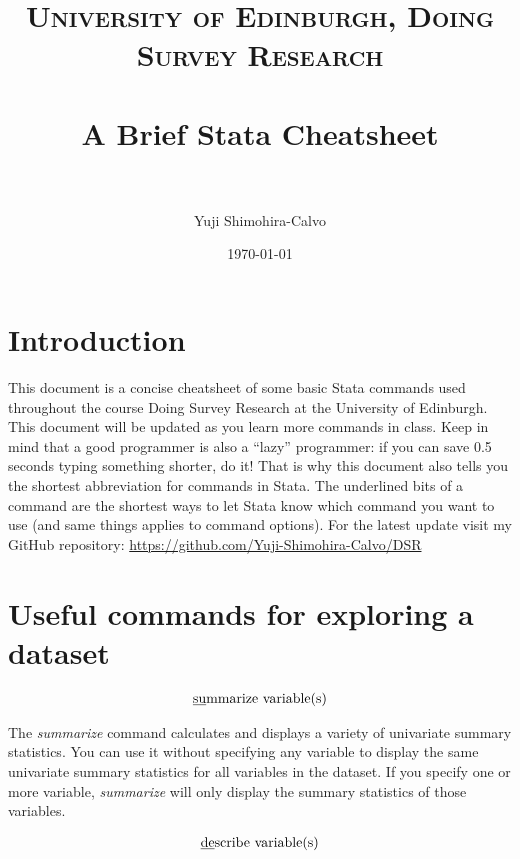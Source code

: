 \documentclass[paper=a4, fontsize=11pt]{scrartcl} %
\title{	
\normalfont \normalsize 
\textsc{University of Edinburgh, Doing Survey Research} \\ [25pt] %
\horrule{0.5pt} \\[0.4cm] %
\huge A Brief Stata Cheatsheet \\ %
\horrule{2pt} \\[0.5cm] %
}
\author{Yuji Shimohira-Calvo} %
\date{\normalsize\today} %
\numberwithin{equation}{section} %
\numberwithin{figure}{section} %
\numberwithin{table}{section} %
\begin{document}
\maketitle %


\section*{Introduction}

This document is a concise cheatsheet of some basic Stata commands used throughout the course Doing Survey Research at the University of Edinburgh. This document will be updated as you learn more commands in class. Keep in mind that a good programmer is also a ``lazy'' programmer: if you can save 0.5 seconds typing something shorter, do it! That is why this document also tells you the shortest abbreviation for commands in Stata. The underlined bits of a command are the shortest ways to let Stata know which command you want to use (and same things applies to command options). For the latest update visit my GitHub repository: \url{https://github.com/Yuji-Shimohira-Calvo/DSR}  


\section{Useful commands for exploring a dataset}

\begin{align} 
\text{\underline{su}mmarize variable(s)}
\end{align}

The \textit{summarize} command calculates and displays a variety of univariate summary statistics. You can use it without specifying any variable to display the same univariate summary statistics for all variables in the dataset. If you specify one or more variable, \textit{summarize} will only display the summary statistics of those variables.

\begin{align}
	\text{\underline{de}scribe variable(s)}
\end{align}
\end{document}
